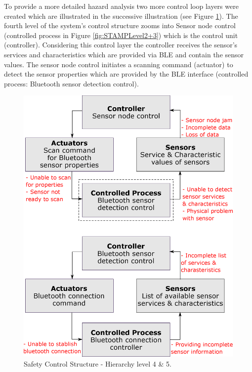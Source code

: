 \documentclass[10pt,journal,compsoc]{IEEEtran}
\begin{document}
	To provide a more detailed hazard analysis two more control loop layers were created which are illustrated in the successive illustration (see Figure  \ref{fig:STAMPLevel4+5}). The fourth level of the system's control structure zooms into Sensor node control (controlled process in Figure \ref{fig:STAMPLevel2+3}) which is the control unit (controller). Considering this control layer the controller receives the sensor's services and characteristics which are provided via BLE and contain the sensor values. The sensor node control initiates a scanning command (actuator) to detect the sensor properties which are provided by the BLE interface (controlled process: Bluetooth sensor detection control).  
	
	\begin{figure}[!ht]
		\centering
		\includegraphics[scale=0.35]{Images/STAMP4+5level.eps}
		\caption[Safety Control Structure - Hierarchy level 4 \& 5]{Safety Control Structure - Hierarchy level 4 \& 5.}
		\label{fig:STAMPLevel4+5}
	\end{figure}
	
\end{document}
